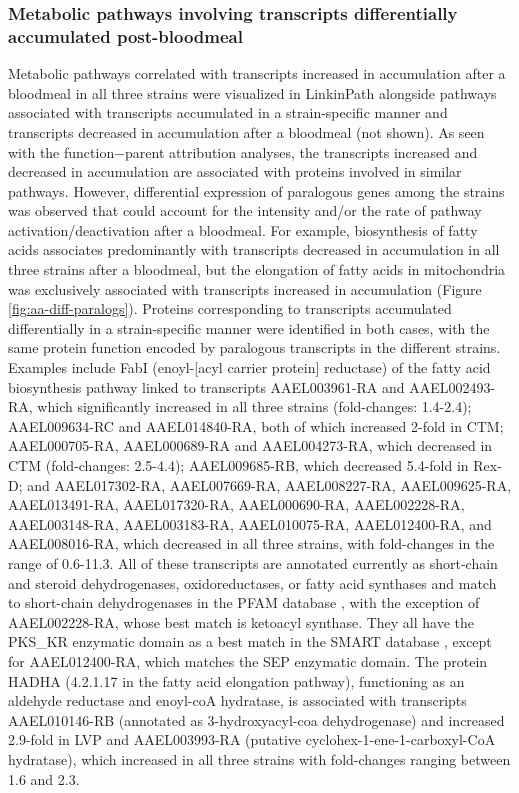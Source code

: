 \subsubsection{Metabolic pathways involving transcripts differentially accumulated post-bloodmeal}

Metabolic pathways correlated with transcripts increased in accumulation after a bloodmeal in all three strains were visualized in LinkinPath \cite{Ingsriswang2011} alongside pathways associated with transcripts accumulated in a strain-specific manner and transcripts decreased in accumulation after a bloodmeal (not shown).
As seen with the function−parent attribution analyses, the transcripts increased and decreased in accumulation are associated with proteins involved in similar pathways.
However, differential expression of paralogous genes among the strains was observed that could account for the intensity and/or the rate of pathway activation/deactivation after a bloodmeal.
For example, biosynthesis of fatty acids associates predominantly with transcripts decreased in accumulation in all three strains after a bloodmeal, but the elongation of fatty acids in mitochondria was exclusively associated with transcripts increased in accumulation (Figure \ref{fig:aa-diff-paralogs}).
Proteins corresponding to transcripts accumulated differentially in a strain-specific manner were identified in both cases, with the same protein function encoded by paralogous transcripts in the different strains.
Examples include FabI (enoyl-[acyl carrier protein] reductase) of the fatty acid biosynthesis pathway linked to transcripts AAEL003961-RA and AAEL002493-RA, which significantly increased in all three strains (fold-changes: 1.4-2.4); AAEL009634-RC and AAEL014840-RA, both of which increased 2-fold in \gls{CTM}; AAEL000705-RA, AAEL000689-RA and AAEL004273-RA, which decreased in \gls{CTM} (fold-changes: 2.5-4.4); AAEL009685-RB, which decreased 5.4-fold in \gls{Rex-D}; and AAEL017302-RA, AAEL007669-RA, AAEL008227-RA, AAEL009625-RA, AAEL013491-RA, AAEL017320-RA, AAEL000690-RA, AAEL002228-RA, AAEL003148-RA, AAEL003183-RA, AAEL010075-RA, AAEL012400-RA, and AAEL008016-RA, which decreased in all three strains, with fold-changes in the range of 0.6-11.3.
All of these transcripts are annotated currently as short-chain and steroid dehydrogenases, oxidoreductases, or fatty acid synthases \cite{Ribeiro-AegyXcel} and match to short-chain dehydrogenases in the PFAM database \cite{Finn2008}, with the exception of AAEL002228-RA, whose best match is ketoacyl synthase.
They all have the PKS\_KR enzymatic domain as a best match in the SMART database \cite{Letunic2009}, except for AAEL012400-RA, which matches the SEP enzymatic domain.
The protein HADHA (4.2.1.17 in the fatty acid elongation pathway), functioning as an aldehyde reductase and enoyl-coA hydratase, is associated with transcripts AAEL010146-RB (annotated as 3-hydroxyacyl-coa dehydrogenase) and increased 2.9-fold in \gls{LVP} and AAEL003993-RA (putative cyclohex-1-ene-1-carboxyl-CoA hydratase), which increased in all three strains with fold-changes ranging between 1.6 and 2.3.



